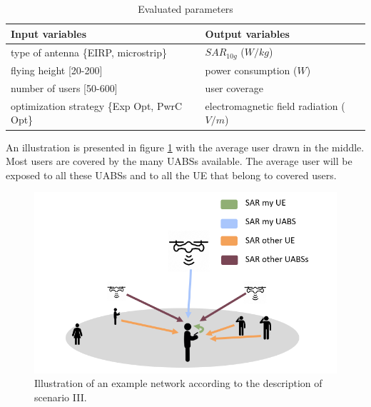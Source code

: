 \begin{table}[!htb]
      \centering
            \begin{tabular}{|l|l|}
            \hline
            \textbf{Input variables  }                        & \textbf{Output variables}       \\   \hline 
            type of antenna  \{EIRP, microstrip\}               & $SAR_{10g}$ ($W/kg$)                    \\ 
            flying height    [20-200]                         & power consumption ($W$)             \\ 
            number of users  [50-600]                         & user coverage                   \\
            optimization strategy \{Exp Opt, PwrC Opt\}         &   electromagnetic field radiation ($V/m$)\\
            \hline
            \end{tabular}
                 \caption{Evaluated parameters}
          \label{table:s3:evalpara}
\end{table}

An illustration is presented in figure \ref{fig:IllustrationS3} with the average user drawn in the middle.
Most users are covered by the many \gls{UABS}s available. The average user 
will be exposed to all these \gls{UABS}s and to all the \gls{UE} that belong to covered users.

\begin{figure}[H]
\centering
  \includegraphics[width=\textwidth/10*7]{../images/IllustrationS3.png}
  \caption{Illustration of an example network according to the description of scenario III.}
  \label{fig:IllustrationS3}
\end{figure}

